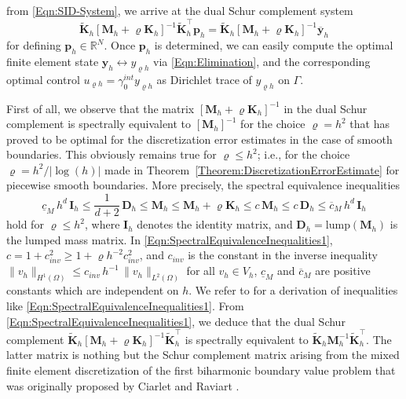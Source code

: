 \documentclass{article}
\numberwithin{equation}{section}
\begin{document}
from \eqref{Eqn:SID-System}, we arrive at the dual Schur complement system 
\begin{equation}\label{Eqn:DualSchurComplementSystem}
  \widetilde{\mathbf{K}}_h [\mathbf{M}_h+\varrho \mathbf{K}_h]^{-1}
  \widetilde{\mathbf{K}}_h^\top \mathbf{p}_h =
  \widetilde{\mathbf{K}}_h [\mathbf{M}_h +
  \varrho \mathbf{K}_h]^{-1} \overline{\mathbf{y}}_h
\end{equation}
for defining $\mathbf{p}_h \in \mathbb{R}^N$. Once $\mathbf{p}_h$ is
determined, we can easily compute the optimal finite element state
$\mathbf{y}_h \leftrightarrow y_{\varrho h}$ via \eqref{Eqn:Elimination}, and
the corresponding optimal control $u_{\varrho h} = \gamma_0^{int} y_{\varrho h}$ 
as Dirichlet trace of $y_{\varrho h}$ on $\Gamma$.

First of all, we observe that the matrix
$[\mathbf{M}_h+\varrho \mathbf{K}_h]^{-1}$ in the dual Schur complement is
spectrally equivalent to $[\mathbf{M}_h]^{-1}$ for the choice $\varrho = h^2$
that has proved to be optimal for the discretization error estimates 
in the case of smooth boundaries. This obviously remains true for
$\varrho \le h^2$; i.e., for the choice $\varrho = h^2/|\log(h)|$ made in
Theorem~\ref{Theorem:DiscretizationErrorEstimate} for piecewise smooth
boundaries. More precisely, the spectral equivalence inequalities
\begin{equation}\label{Eqn:SpectralEquivalenceInequalities1}
  \underline{c}_M \, h^d \, \mathbf{I}_h \le
  \frac{1}{d+2} \, \mathbf{D}_h \le \mathbf{M}_h \le
  \mathbf{M}_h+\varrho \mathbf{K}_h 
  \le c \, \mathbf{M}_h \le c \, \mathbf{D}_h \le
  \overline{c}_M \, h^d \, \mathbf{I}_h
\end{equation}
hold for $\varrho \le h^2$, where $\mathbf{I}_h$ denotes the identity matrix,
and $\mathbf{D}_h = \mbox{lump}(\mathbf{M}_h)$ is the lumped mass matrix.
In \eqref{Eqn:SpectralEquivalenceInequalities1}, 
$c = 1 + c_{inv}^2 \ge  1 + \varrho h^{-2} c_{inv}^2$, and $c_{inv}$ is the
constant in the inverse inequality 
$\|v_h\|_{H^1(\Omega)} \le c_{inv} \, h^{-1} \, \|v_h\|_{L^2(\Omega)}$
for all $v_h \in V_h$, $\underline{c}_M$ and $\overline{c}_M$ are positive
constants which are independent on $h$. We refer to
\cite{LangerLoescherSteinbachYang:2024NLA} for a derivation of inequalities
like \eqref{Eqn:SpectralEquivalenceInequalities1}.
From \eqref{Eqn:SpectralEquivalenceInequalities1}, we deduce that 
the dual Schur complement $\widetilde{\mathbf{K}}_h
[\mathbf{M}_h+\varrho \mathbf{K}_h]^{-1} \widetilde{\mathbf{K}}_h^\top$
is spectrally equivalent to 
$\widetilde{\mathbf{K}}_h \mathbf{M}_h^{-1} \widetilde{\mathbf{K}}_h^\top$.
The latter matrix is nothing but the Schur complement matrix arising
from the mixed finite element discretization of the first biharmonic 
boundary value problem that was originally proposed by Ciarlet and
Raviart \cite{CiarleRaviart1974Proceedings}.
\end{document}
